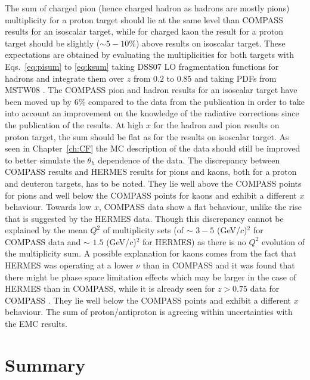 The sum of charged pion (hence charged hadron as hadrons are mostly pions) multiplicity for a proton target should lie at the same level than COMPASS results for an isoscalar target, while for charged kaon the result for a proton target should be slightly ($\sim$$5-10$\%) above results on isoscalar target. These expectations are obtained by evaluating the multiplicities for both targets with Eqs.~\ref{eq:pisum} to \ref{eq:ksum} taking DSS07 \cite{DSS07} LO fragmentation functions for hadrons and integrate them over $z$ from $0.2$ to $0.85$ and taking PDFs from MSTW08 \cite{MSTW08}. The COMPASS pion and hadron results for an isoscalar target have been moved up by $6$\% compared to the data from the publication in order to take into account an improvement on the knowledge of the radiative corrections since the publication of the results. At high $x$ for the hadron and pion results on proton target, the sum should be flat as for the results on isoscalar target. As seen in Chapter~\ref{ch:CF} the MC description of the data should still be improved to better simulate the $\theta_h$ dependence of the data. The discrepancy between COMPASS results and HERMES results for pions and kaons, both for a proton and deuteron targets, has to be noted. They lie well above the COMPASS points for pions and well below the COMPASS points for kaons and exhibit a different $x$ behaviour. Towards low $x$, COMPASS data show a flat behaviour, unlike the rise that is suggested by the HERMES data. Though this discrepancy cannot be explained by the mean $Q^2$ of multiplicity sets (of $\sim$ $3-5$ (GeV/$c$)$^2$ for COMPASS data and $\sim$ $1.5$ (GeV/$c$)$^2$ for HERMES) as there is no $Q^2$ evolution of the multiplicity sum. A possible explanation for kaons comes from the fact that HERMES was operating at a lower $\nu$ than in COMPASS and it was found that there might be phase space limitation effects which may be larger in the case of HERMES than in COMPASS, while it is already seen for $z>0.75$ data for COMPASS \cite{MarcinPubli}. They lie well below the COMPASS points and exhibit a different $x$ behaviour. The sum of proton/antiproton is agreeing within uncertainties with the EMC results.

\newpage

\section{Summary}

